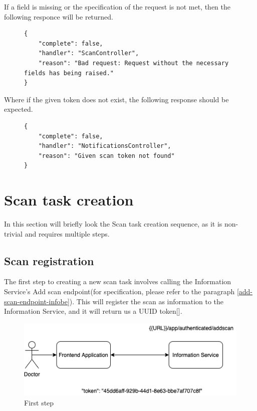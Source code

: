 					If a field is missing or the specification of the request is not met, then the following responce will be returned.
					\begin{figure}[H]
						\iftrue
						\begin{lstlisting}[]
{
	"complete": false,
	"handler": "ScanController",
	"reason": "Bad request: Request without the necessary fields has being raised."
}					
						\end{lstlisting}
					\end{figure}
					Where if the given token does not exist, the following response should be expected.
					\begin{figure}[H]
						\iftrue
						\begin{lstlisting}[]
{
	"complete": false,
	"handler": "NotificationsController",
	"reason": "Given scan token not found"
}		
						\end{lstlisting}
					\end{figure}
	
	\section{Scan task creation}
		\label{scan-creation}
		In this section will briefly look the Scan task creation sequence, as it is non-trivial and requires multiple steps.
		\subsection{Scan registration}
			\label{first-step}
			
			The first step to creating a new scan task involves calling the Information Service's Add scan endpoint(for specification, 
			please refer to the paragraph \ref{add-scan-endpoint-infobe}). This will register the scan as information to the Information 
			Service, and it will return us a UUID token[\cite{rfc4122}].

			\begin{figure}[H]
				\iftrue
				\caption{First step}
				\centering
				\includegraphics[scale=0.6]{figures/sca-creation-sequence-1-Page-2}
				\fi
			\end{figure}

